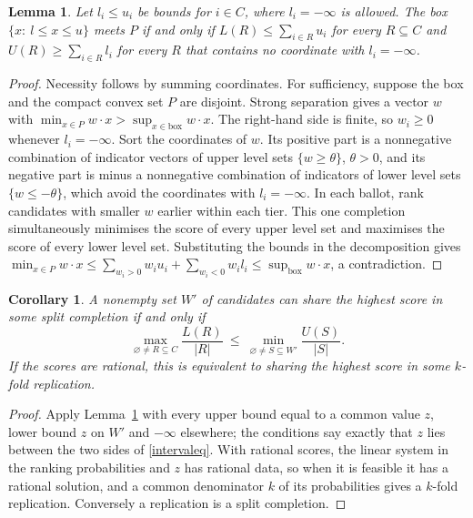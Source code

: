 \documentclass[11pt,a4paper]{article}
\newtheorem{lemma}[theorem]{Lemma}
\newtheorem{corollary}[theorem]{Corollary}
\theoremstyle{definition}
\theoremstyle{remark}
\begin{document}
\begin{lemma}\label{box}
Let $l_i\le u_i$ be bounds for $i\in C$, where $l_i=-\infty$ is allowed. The box $\{x:\ l\le x\le u\}$ meets $P$ if and only if $L(R)\le\sum_{i\in R}u_i$ for every $R\subseteq C$ and $U(R)\ge\sum_{i\in R}l_i$ for every $R$ that contains no coordinate with $l_i=-\infty$.
\end{lemma}
\begin{proof}
Necessity follows by summing coordinates. For sufficiency, suppose the box and the compact convex set $P$ are disjoint. Strong separation gives a vector $w$ with $\min_{x\in P}w\cdot x>\sup_{x\in\text{box}}w\cdot x$. The right-hand side is finite, so $w_i\ge0$ whenever $l_i=-\infty$. Sort the coordinates of $w$. Its positive part is a nonnegative combination of indicator vectors of upper level sets $\{w\ge\theta\}$, $\theta>0$, and its negative part is minus a nonnegative combination of indicators of lower level sets $\{w\le-\theta\}$, which avoid the coordinates with $l_i=-\infty$. In each ballot, rank candidates with smaller $w$ earlier within each tier. This one completion simultaneously minimises the score of every upper level set and maximises the score of every lower level set. Substituting the bounds in the decomposition gives $\min_{x\in P}w\cdot x\le\sum_{w_i>0}w_iu_i+\sum_{w_i<0}w_il_i\le\sup_{\text{box}}w\cdot x$, a contradiction.
\end{proof}

\begin{corollary}\label{interval}
A nonempty set $W'$ of candidates can share the highest score in some split completion if and only if
\begin{equation}
  \max_{\varnothing\ne R\subseteq C}\frac{L(R)}{|R|}
  \ \le\ \min_{\varnothing\ne S\subseteq W'}\frac{U(S)}{|S|}.\label{intervaleq}
\end{equation}
If the scores are rational, this is equivalent to sharing the highest score in some $k$-fold replication.
\end{corollary}
\begin{proof}
Apply Lemma~\ref{box} with every upper bound equal to a common value $z$, lower bound $z$ on $W'$ and $-\infty$ elsewhere; the conditions say exactly that $z$ lies between the two sides of \eqref{intervaleq}. With rational scores, the linear system in the ranking probabilities and $z$ has rational data, so when it is feasible it has a rational solution, and a common denominator $k$ of its probabilities gives a $k$-fold replication. Conversely a replication is a split completion.
\end{proof}
\end{document}
